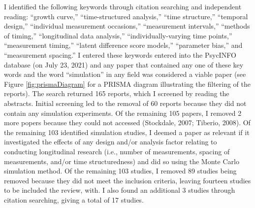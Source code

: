 \documentclass[
12pt, %
twoside,
english]{guelphthesis}
\theoremstyle{definition}
\theoremstyle{definition}
\theoremstyle{definition}
\theoremstyle{definition}
\theoremstyle{remark}
\begin{document}
I identified the following keywords through citation searching and independent reading: ``growth curve,'' ``time-structured analysis,'' ``time structure,'' ``temporal design,'' ``individual measurement occasions,'' ``measurement intervals,'' ``methods of timing,'' ``longitudinal data analysis,'' ``individually-varying time points,'' ``measurement timing,'' ``latent difference score models,'' ``parameter bias,'' and ``measurement spacing.'' I entered these keywords entered into the PsycINFO database (on July 23, 2021) and any paper that contained any one of these key words and the word ``simulation'' in any field was considered a viable paper (see Figure \ref{fig:prismaDiagram} for a PRISMA diagram illustrating the filtering of the reports). The search returned 165 reports, which I screened by reading the abstracts. Initial screening led to the removal of 60 reports because they did not contain any simulation experiments. Of the remaining 105 papers, I removed 2 more popers because they could not accessed (Stockdale, 2007; Tiberio, 2008). Of the remaining 103 identified simulation studies, I deemed a paper as relevant if it investigated the effects of any design and/or analysis factor relating to conducting longitudinal research (i.e., number of measurements, spacing of measurements, and/or time structuredness) and did so using the Monte Carlo simulation method. Of the remaining 103 studies, I removed 89 studies being removed because they did not meet the inclusion criteria, leaving fourteen studies to be included the review, with. I also found an additional 3 studies through citation searching, giving a total of 17 studies.
\end{document}
